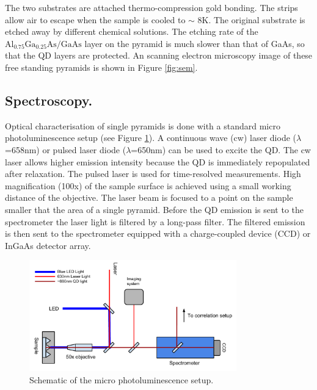 \documentclass[12pt, twoside]{article}
\numberwithin{equation}{section}
\begin{document}

The two substrates are attached thermo-compression gold bonding. The
strips allow air to escape when the sample is cooled to $\sim$ 8K. The
original substrate is etched away by different chemical solutions. The
etching rate of the $\text{Al}_{0.75}\text{Ga}_{0.25}\text{As/GaAs}$
layer on the pyramid is much slower than that of GaAs, so that the QD
layers are protected. An scanning electron microscopy image of these
free standing pyramids is shown in Figure \ref{fig:sem}.

\subsection{Spectroscopy.}\label{spectroscopy.}

Optical characterisation of single pyramids is done with a standard
micro photoluminescence setup (see Figure \ref{fig:upl}). A continuous
wave (cw) laser diode ($\lambda$=658nm) or pulsed laser diode
($\lambda$=650nm) can be used to excite the QD. The cw laser allows
higher emission intensity because the QD is immediately repopulated
after relaxation. The pulsed laser is used for time-resolved
measurements. High magnification (100x) of the sample surface is
achieved using a small working distance of the objective. The laser beam
is focused to a point on the sample smaller that the area of a single
pyramid. Before the QD emission is sent to the spectrometer the laser
light is filtered by a long-pass filter. The filtered emission is then
sent to the spectrometer equipped with a charge-coupled device (CCD) or
InGaAs detector array.

\begin{figure}[h!]
    \centering
    \includegraphics[width=0.8\textwidth]{images/PL.pdf}
    \caption{Schematic of the micro photoluminescence setup.}
    \label{fig:upl}
\end{figure}
\end{document}
